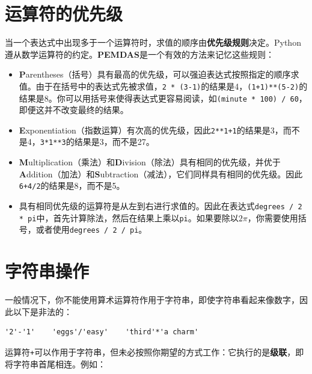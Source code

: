 \section{运算符的优先级}

当一个表达式中出现多于一个运算符时，求值的顺序由{\bf 优先级规则}决定。Python遵从数学运算符的约定。{\bf PEMDAS}是一个有效的方法来记忆这些规则：


\begin{itemize}

\item {\bf P}arentheses（括号）具有最高的优先级，可以强迫表达式按照指定的顺序求值。由于在括号中的表达式先被求值，{\tt 2 * (3-1)}的结果是4，{\tt (1+1)**(5-2)}的结果是8。你可以用括号来使得表达式更容易阅读，如{\tt (minute * 100) / 60}，即便这并不改变最终的结果。

\item {\bf E}xponentiation（指数运算）有次高的优先级，因此{\tt 2**1+1}的结果是3，而不是4，{\tt 3*1**3}的结果是3，而不是27。

\item {\bf M}ultiplication（乘法）和{\bf D}ivision（除法）具有相同的优先级，并优于{\bf A}ddition（加法）和{\bf S}ubtraction（减法），它们同样具有相同的优先级。因此{\tt 6+4/2}的结果是8，而不是5。

\item 具有相同优先级的运算符是从左到右进行求值的。因此在表达式{\tt degrees / 2 * pi}中，首先计算除法，然后在结果上乘以{\tt pi}。如果要除以$2 \pi$，你需要使用括号，或者使用{\tt degrees / 2 / pi}。

\end{itemize}


\section{字符串操作}

一般情况下，你不能使用算术运算符作用于字符串，即使字符串看起来像数字，因此以下是非法的：

\beforeverb
\begin{verbatim}
'2'-'1'    'eggs'/'easy'    'third'*'a charm'
\end{verbatim}
\afterverb
%
运算符{\tt +}可以作用于字符串，但未必按照你期望的方式工作：它执行的是{\bf 级联}，即将字符串首尾相连。例如：


